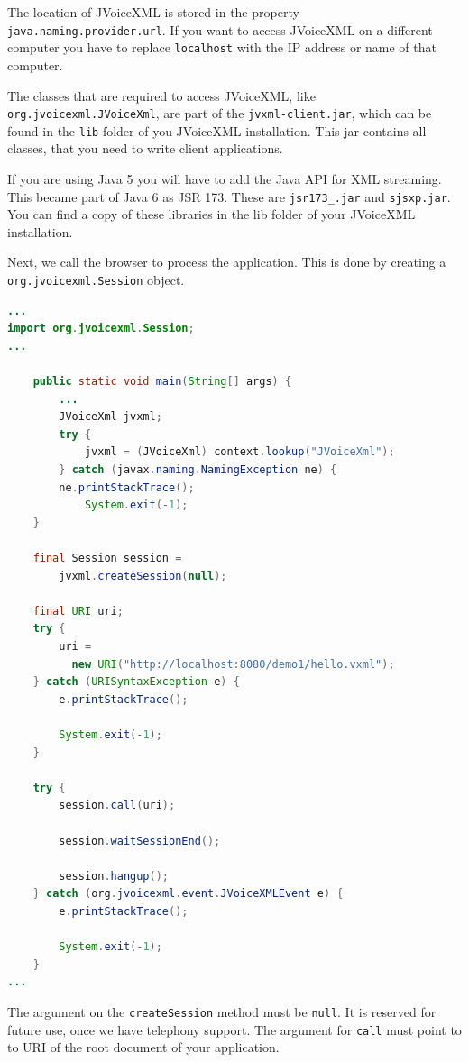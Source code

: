 \documentclass[11pt,a4paper]{article}
\begin{document}
The location of JVoiceXML is stored in the property 
\texttt{java.naming.pro\-vider.url}. If you want to access JVoiceXML on a 
different computer you have to replace \texttt{localhost} with the IP address 
or name of that computer.

The classes  that are required to access JVoiceXML, like 
\texttt{org.jvoice\-xml.JVoiceXml}, are part of the
\texttt{jvxml-client.jar}, which can be found in the \texttt{lib}
folder of you JVoiceXML installation. This jar contains all classes, that you 
need to write client applications.

If you are using Java 5 you will have to add the Java API for XML streaming.
This became part of Java 6 as JSR 173. These are \texttt{jsr173\_.jar} and
\texttt{sjsxp.jar}. You can find a copy of these libraries in the lib folder of your JVoiceXML installation.

Next, we call the browser to process the application. This is done
by creating a \texttt{org.jvoicexml.Session} object.

\begin{lstlisting}[language=Java]
...
import org.jvoicexml.Session;
...

    public static void main(String[] args) {
        ...
        JVoiceXml jvxml;
        try {
            jvxml = (JVoiceXml) context.lookup("JVoiceXml");
        } catch (javax.naming.NamingException ne) {
	    ne.printStackTrace();
            System.exit(-1);
    }

    final Session session = 
        jvxml.createSession(null);

    final URI uri;
    try {
        uri = 
          new URI("http://localhost:8080/demo1/hello.vxml");
    } catch (URISyntaxException e) {
        e.printStackTrace();

        System.exit(-1);
    }

    try {
        session.call(uri);

        session.waitSessionEnd();

        session.hangup();
    } catch (org.jvoicexml.event.JVoiceXMLEvent e) {
        e.printStackTrace();

        System.exit(-1);
    }
...
\end{lstlisting}

The argument on the \texttt{createSession} method must be 
\texttt{null}. It is reserved for future use, once we have telephony
support. The argument for \texttt{call} must point to to URI of the
root document of your application.
\end{document}
